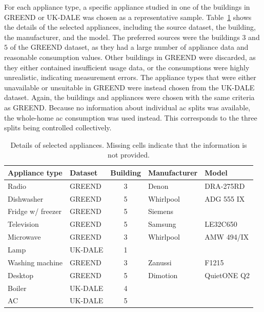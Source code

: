 For each appliance type, a specific appliance studied in one of the buildings in GREEND or UK-DALE was chosen as a representative sample. Table~\ref{tab:appliances_details} shows the details of the selected appliances, including the source dataset, the building, the manufacturer, and the model. The preferred sources were the buildings $3$ and $5$ of the GREEND dataset, as they had a large number of appliance data and reasonable consumption values. Other buildings in GREEND were discarded, as they either contained insufficient usage data, or the consumptions were highly unrealistic, indicating measurement errors. The appliance types that were either unavailable or unsuitable in GREEND were instead chosen from the UK-DALE dataset. Again, the buildings and appliances were chosen with the same criteria as GREEND. Because no information about individual \acrshort{ac} splits was available, the whole-home \acrshort{ac} consumption was used instead. This corresponds to the three splits being controlled collectively.

\begin{table}
\centering
\begin{tabular}{llcll}
\hline
\textbf{Appliance type} & \textbf{Dataset} & \textbf{Building} & \textbf{Manufacturer} & \textbf{Model} \\ \hline
Radio             & GREEND  & 3 & Denon       & DRA-275RD   \\
Dishwasher        & GREEND  & 5 & Whirlpool   & ADG 555 IX  \\
Fridge w/ freezer & GREEND  & 5 & Siemens     &             \\
Television        & GREEND  & 5 & Samsung     & LE32C650    \\
Microwave         & GREEND  & 3 & Whirlpool   & AMW 494/IX  \\
Lamp              & UK-DALE & 1 &             &             \\
Washing machine   & GREEND  & 3 & Zanussi     & F1215       \\
Desktop           & GREEND  & 5 & Dimotion    & QuietONE Q2 \\
Boiler            & UK-DALE & 4 &             &             \\
AC                & UK-DALE & 5 &             &             \\ \hline
\end{tabular}%
\caption{Details of selected appliances. Missing cells indicate that the information is not provided.}
\label{tab:appliances_details}
\end{table}

